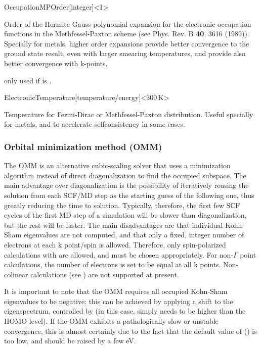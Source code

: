 \begin{fdfentry}{OccupationMPOrder}[integer]<1>
  
  Order of the Hermite-Gauss polynomial expansion for the electronic
  occupation functions in the Methfessel-Paxton scheme (see
  Phys. Rev. B \textbf{40}, 3616 (1989)).  Specially for metals,
  higher order expansions provide better convergence to the ground
  state result, even with larger smearing temperatures, and provide
  also better convergence with k-points.

  \note only used if  is .

\end{fdfentry}


\begin{fdfentry}{ElectronicTemperature}[temperature/energy]<$300\,\mathrm{K}$>
  
  Temperature for Fermi-Dirac or Methfessel-Paxton
  distribution. Useful specially for metals, and to accelerate
  selfconsistency in some cases.

\end{fdfentry}



\subsubsection{Orbital minimization method (OMM)}
\label{SolverOMM}

The OMM is an alternative cubic-scaling solver that uses a
minimization algorithm instead of direct diagonalization to find the
occupied subspace.  The main advantage over diagonalization is the
possibility of iteratively reusing the solution from each SCF/MD step
as the starting guess of the following one, thus greatly reducing the
time to solution. Typically, therefore, the first few SCF cycles of
the first MD step of a simulation will be slower than diagonalization,
but the rest will be faster. The main disadvantages are that
individual Kohn-Sham eigenvalues are not computed, and that only a
fixed, integer number of electrons at each k point/spin is
allowed. Therefore, only spin-polarized calculations with
 are allowed, and  must be chosen
appropriately. For non-$\Gamma$ point calculations, the number of
electrons is set to be equal at all k points. Non-colinear
calculations (see ) are not supported at present.

It is important to note that the OMM requires all occupied Kohn-Sham
eigenvalues to be negative; this can be achieved by applying a shift
to the eigenspectrum, controlled by  (in this case,
 simply needs to be higher than the HOMO level). If the
OMM exhibits a pathologically slow or unstable convergence, this is
almost certainly due to the fact that the default value of
 () is too low, and should be raised by
a few eV.

